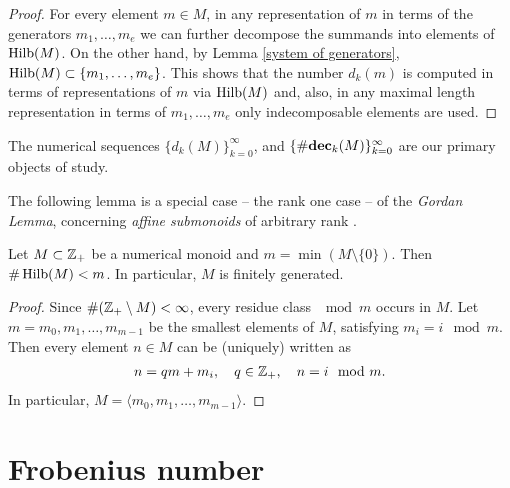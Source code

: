 \begin{proof}
For every element $m\in M$, in any representation of $m$ in terms of the generators $m_1,\ldots,m_e$ we can further decompose the summands into elements of $\operatorname{Hilb}(M)$. On the other hand, by Lemma \ref{system of generators}, $\operatorname{Hilb}(M)\subset\{m_1,\ldots,m_e\}$. This shows that the number $d_k(m)$ is computed in terms of representations of $m$ via $\operatorname{Hilb}(M)$ and, also, in any maximal length representation in terms of $m_1,\ldots,m_e$ only indecomposable elements are used. 
\end{proof}

The numerical sequences $\{d_k(M)\}_{k=0}^\infty$, and $\{\#\textbf{dec}_k(M)\}_{k=0}^\infty$ are our primary objects of study.

The following lemma is a special case -- the rank one case -- of the \emph{Gordan Lemma}, concerning \emph{affine submonoids} of arbitrary rank \cite[Chapter 2]{Kripo}.

\begin{lemma}\label{Gordan}
Let $M\subset\mathbb Z_+$ be a numerical monoid and $m=\min(M\setminus\{0\})$. Then $\#\operatorname{Hilb}(M)<m$. In particular, $M$ is finitely generated.
\end{lemma}

\begin{proof}
Since $\#(\mathbb Z_+\setminus M)<\infty$, every residue class $\mod m$ occurs in $M$. Let $m=m_0,m_1,\ldots,m_{m-1}$ be the smallest elements of $M$, satisfying $m_i=i\mod m$. Then every element $n\in M$ can be (uniquely) written as
\begin{align*}
n=q m+m_i,\quad q\in\mathbb Z_+,\quad n=i\mod m.
\end{align*} 
In particular, $M=\langle m_0,m_1,\ldots,m_{m-1}\rangle$.
\end{proof}

\section{Frobenius number}\label{FBN}

